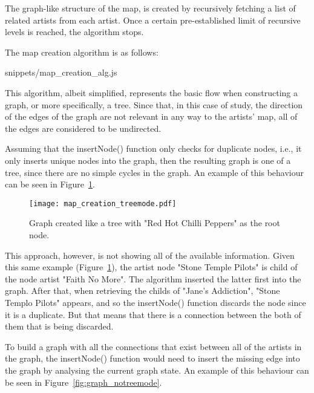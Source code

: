      The graph-like structure of the map, is created by recursively fetching a list of related artists from each artist. Once a certain pre-established limit of recursive levels is reached, the algorithm stops.

      The map creation algorithm is as follows:

      
      {snippets/map_creation_alg.js}

      This algorithm, albeit simplified, represents the basic flow when constructing a graph, or more specifically, a tree.
      Since that, in this case of study, the direction of the edges of the graph are not relevant in any way to the artists' map, all of the edges are considered to be undirected.

      Assuming that the insertNode() function only checks for duplicate nodes, i.e., it only inserts unique nodes into the graph, then the resulting graph is one of a tree, since there are no simple cycles in the graph.
      An example of this behaviour can be seen in Figure~\ref{fig:graph_treemode}.

      \begin{figure}[tb]
        \begin{center}
          \texttt{[image: map\_creation\_treemode.pdf]}
        \end{center}
        \caption{Graph created like a tree with "Red Hot Chilli Peppers" as the root node.}
        \label{fig:graph_treemode}
      \end{figure}

      This approach, however, is not showing all of the available information.
      Given this same example (Figure~\ref{fig:graph_treemode}), the artist node "Stone Temple Pilots" is child of the node artist "Faith No More".
      The algorithm inserted the latter first into the graph.
      After that, when retrieving the childs of "Jane's Addiction", "Stone Templo Pilots" appears, and so the insertNode() function discards the node since it is a duplicate.
      But that means that there is a connection between the both of them that is being discarded.

      To build a graph with all the connections that exist between all of the artists in the graph, the insertNode() function would need to insert the missing edge into the graph by analysing the current graph state.
      An example of this behaviour can be seen in Figure~\ref{fig:graph_notreemode}.


